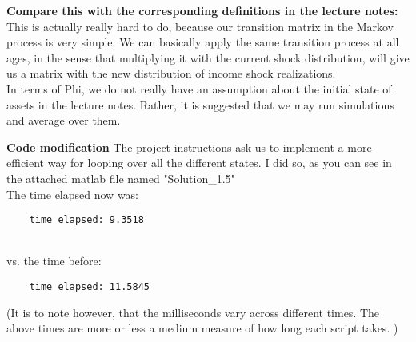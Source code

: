 \documentclass[12pt,a4paper]{article}
\begin{document}
\textbf{Compare this with the corresponding definitions in the lecture notes:} \\
This is actually really hard to do, because our transition matrix in the Markov process is very simple. We can basically apply the same transition process at all ages, in the sense that multiplying it with the current shock distribution, will give us a matrix with the new distribution of income shock realizations. \\

In terms of Phi, we do not really have an assumption about the initial state of assets in the lecture notes. Rather, it is suggested that we may run simulations and average over them. 

\textbf{Code modification}
The project instructions ask us to implement a more efficient way for looping over all the different states. I did so, as you can see in the attached matlab file named "Solution\_1.5" 
\\
The time elapsed now was: 
\begin{lstlisting}
    time elapsed: 9.3518
\end{lstlisting}\\
vs. the time before:
\begin{lstlisting}
    time elapsed: 11.5845
\end{lstlisting}

(It is to note however, that the milliseconds vary across different times. The above times are more or less a medium measure of how long each script takes. )
\end{document}
